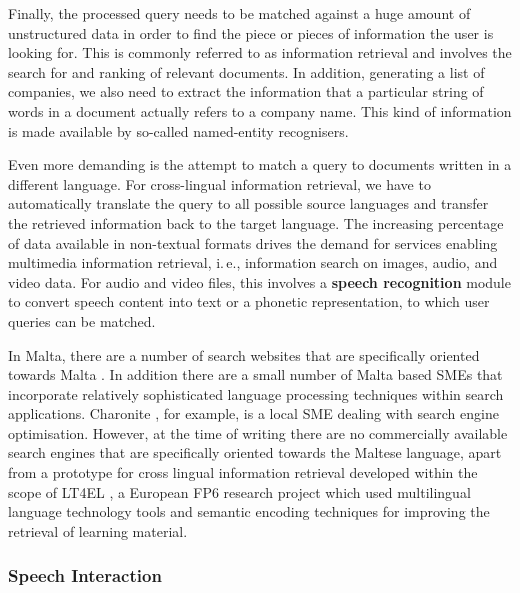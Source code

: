 \begin{multicols}{2}
Finally, the processed query needs to be matched against a huge amount of unstructured data in order to find the piece or pieces of information the user is looking for. This is commonly referred to as information retrieval and involves the search for and ranking of relevant documents. In addition, generating a list of companies, we also need to extract the information that a particular string of words in a document actually refers to a company name. This kind of information is made available by so-called named-entity recognisers. 


Even more demanding is the attempt to match a query to documents written in a different language. For cross-lingual information retrieval, we have to automatically translate the query to all possible source languages and transfer the retrieved information back to the target language. The increasing percentage of data available in non-textual formats drives the demand for services enabling multimedia information retrieval, i.\,e., information search on images, audio, and video data. For audio and video files, this involves a \textbf{speech recognition} module to convert speech content into text or a phonetic representation, to which user queries can be matched.

In Malta, there are a number of search websites that are specifically oriented towards Malta \cite{philb1}. In addition there are a small number of Malta based SMEs that incorporate relatively sophisticated language processing techniques within search applications. Charonite \cite{charonite1}, for example, is a local SME dealing with search engine optimisation. However, at the time of writing there are no commercially available search engines that are specifically oriented towards the Maltese language, apart from a prototype for cross lingual information retrieval developed within the scope of LT4EL \cite{let1}, a European FP6 research project which used multilingual language technology tools and semantic encoding techniques for improving the retrieval of learning material. 

\subsubsection{Speech Interaction}


\end{multicols}
